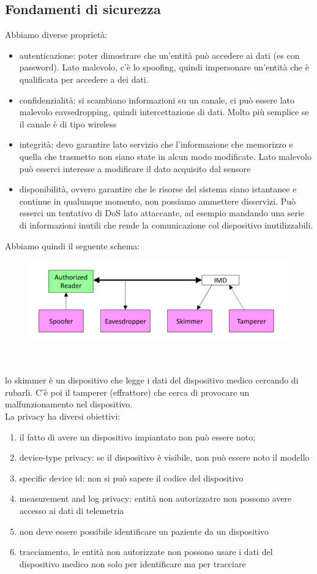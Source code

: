 \documentclass[oneside, 12pt]{extbook}
\begin{document}
\subsection{Fondamenti di sicurezza}
Abbiamo diverse proprietà:
\begin{itemize}
	\item autenticazione: poter dimostrare che un'entità può accedere ai dati (es con password). Lato malevolo, c'è lo spoofing, quindi impersonare un'entità che è qualificata per accedere a dei dati.
	\item confidenzialità: si scambiano informazioni su un canale, ci può essere lato malevolo eavsedropping, quindi intercettazione di dati. Molto più semplice se il canale è di tipo wireless
	\item integrità: devo garantire lato servizio che l'informazione che memorizzo e quella che trasmetto non siano state in alcun modo modificate. Lato malevolo può esserci interesse a modificare il dato acquisito dal sensore
	\item disponibilità, ovvero garantire che le risorse del sistema siano istantanee e continue in qualunque momento, non possiamo ammettere disservizi. Può esserci un tentativo di DoS lato attaccante, ad esempio mandando una serie di informazioni inutili che rende la comunicazione col dispositivo inutilizzabili.
\end{itemize}
Abbiamo quindi il seguente schema:\\
\begin{figure}[!h]
	\includegraphics[scale=0.3]{immagini/schema-sicurezza.png}
\end{figure}\\\\
lo skimmer è un dispositivo che legge i dati del dispositivo medico cercando di rubarli. C'è poi il tamperer (effrattore) che cerca di provocare un malfunzionamento nel dispositivo.\\La privacy ha diversi obiettivi:
\begin{enumerate}
	\item il fatto di avere un dispositivo impiantato non può essere noto;
	\item device-type privacy: se il dispositivo è visibile, non può essere noto il modello
	\item specific device id: non si può sapere il codice del dispositivo
	\item measurement and log privacy: entità non autorizzatre non possono avere accesso ai dati di telemetria
	\item non deve essere possibile identificare un paziente da un dispositivo
	\item tracciamento, le entità non autorizzate non possono usare i dati del dispositivo medico non solo per identificare ma per tracciare
\end{enumerate}
\end{document}
